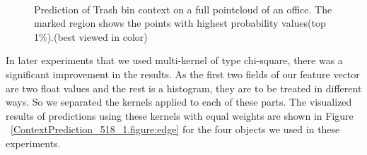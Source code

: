 \begin{figure} [htp]
   \begin{center}
     \\
  \end{center}
  \caption[Prediction of Trash bin model.]
  {Prediction of Trash bin context on a full pointcloud of an office. The marked region shows the points with highest probability values(top 1\%).(best viewed in color)}
  \label{TrashPrediction.figure:edge}
\end{figure}

In later experiments that we used multi-kernel of type chi-square, there was a significant improvement in the results.
As the first two fields of our feature vector are two float values and the rest is a histogram, they are to be treated 
in different ways.
So we separated the kernels applied to each of these parts.
The visualized results of predictions using these kernels with equal weights are shown in Figure ~\ref{ContextPrediction_518_1.figure:edge} 
for the four objects we used in these experiments.

